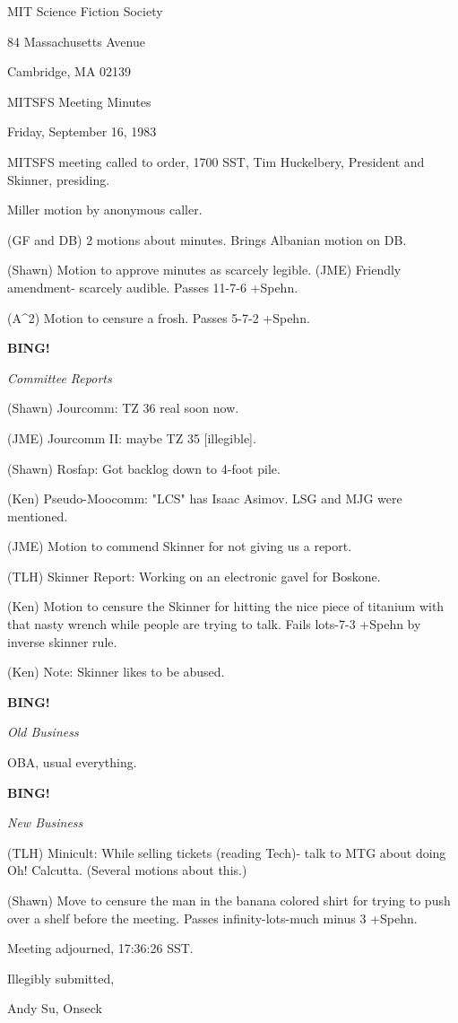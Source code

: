 \documentclass[12pt]{article}
\newcommand{\bing}{{\bf BING!} }
\newcommand{\goto}[1]{\bing \vskip 12pt \centerline{{\em{#1}}}}
\begin{document}
\begin{center}

MIT Science Fiction Society 

84 Massachusetts Avenue

Cambridge, MA 02139

\vspace{12pt}

MITSFS Meeting Minutes 

Friday, September 16, 1983

\end{center}
 
\vspace{18pt}

\setlength{\parskip}{6pt}

\noindent
MITSFS meeting called to order, 1700 SST,
Tim Huckelbery, President and Skinner, presiding.

Miller motion by anonymous caller.

(GF and DB) 2 motions about minutes. Brings Albanian motion on DB.

(Shawn) Motion to approve minutes as scarcely legible. (JME) Friendly amendment- scarcely audible. Passes 11-7-6 +Spehn.

(A^2) Motion to censure a frosh. Passes 5-7-2 +Spehn.

\goto{Committee Reports}

(Shawn) Jourcomm: TZ 36 real soon now.

(JME) Jourcomm II: maybe TZ 35 [illegible].

(Shawn) Rosfap: Got backlog down to 4-foot pile.

(Ken) Pseudo-Moocomm: "LCS" has Isaac Asimov. LSG and MJG were mentioned.

(JME) Motion to commend Skinner for not giving us a report.

(TLH) Skinner Report: Working on an electronic gavel for Boskone.

(Ken) Motion to censure the Skinner for hitting the nice piece of titanium with that nasty wrench while people are trying to talk. Fails lots-7-3 +Spehn by inverse skinner rule.

(Ken) Note: Skinner likes to be abused.

\goto{Old Business}

OBA, usual everything.

\goto{New Business}

(TLH) Minicult: While selling tickets (reading Tech)- talk to MTG about doing Oh! Calcutta. (Several motions about this.)

(Shawn) Move to censure the man in the banana colored shirt for trying to push over a shelf before the meeting. Passes infinity-lots-much minus 3 +Spehn.

\vspace{12pt}

\noindent
Meeting adjourned, 17:36:26 SST.

\vspace{18pt}

\centerline{Illegibly submitted,}
\centerline{Andy Su, Onseck}
\end{document}
